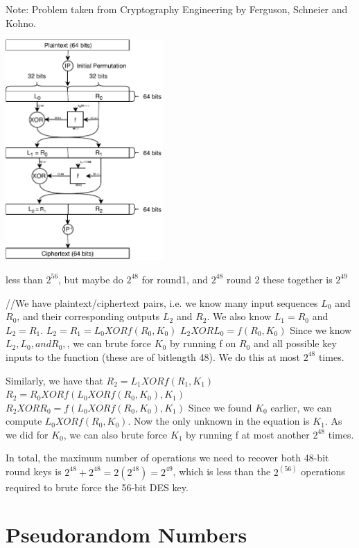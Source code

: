 \documentclass[12pt, letterpaper]{article}
\begin{document}
Note: Problem taken from Cryptography Engineering by Ferguson, Schneier and Kohno.


\includegraphics[width=6cm]{4109fig1.pdf}


less than $2^{56}$, but maybe do $2^{48}$ for round1, and $2^{48}$ round 2 these together is $2^{49}$

//We have plaintext/ciphertext pairs, i.e. we know many input sequences $L_0$ and $R_0$, and their corresponding outputs $L_2$ and $R_2$. We also know $L_1 = R_0$ and $L_2 = R_1$. 
$L_2 = R_1 = L_0 XOR f(R_0,K_0)$
$L_2 XOR L_0 = f(R_0,K_0)$
Since we know $L_2, L_0, and R_0,$, we can brute force $K_0$ by running f on $R_0$ and all possible key inputs to the function (these are of bitlength 48). We do this at most $2^48$ times. 

Similarly, we have that $R_2 = L_1 XOR f(R_1,K_1)$
$R_2 = R_0 XOR f(L_0 XOR f(R_0,K_0),K_1)$
$R_2 XOR R_0 = f(L_0 XOR f(R_0,K_0),K_1)$
Since we found $K_0$ earlier, we can compute $L_0 XOR f(R_0,K_0)$. Now the only unknown in the equation is $K_1$. As we did for $K_0$, we can also brute force $K_1$ by running f at most another $2^48$ times.

In total, the maximum number of operations we need to recover both 48-bit round keys is $2^48 + 2^48 = 2(2^48) = 2^49$, which is less than the $2^(56)$ operations required to brute force the 56-bit DES key.


\clearpage
\section{Pseudorandom Numbers}
\end{document}
